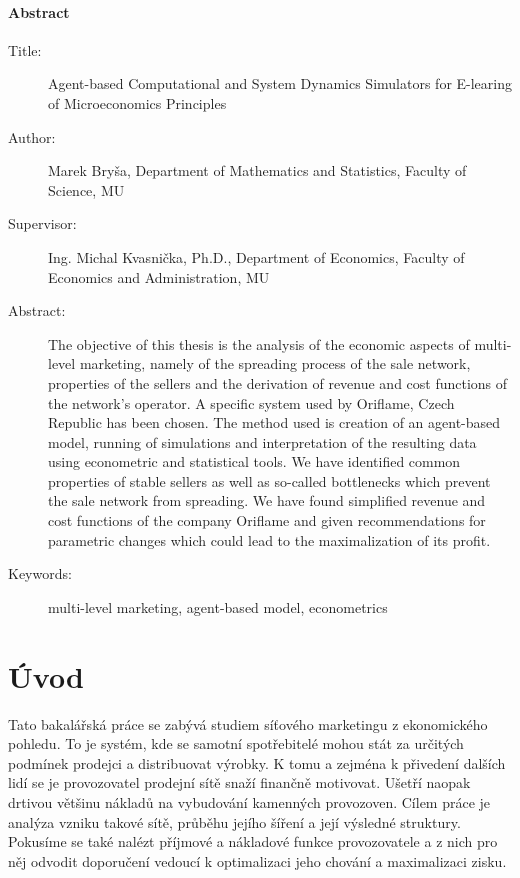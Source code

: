 \documentclass[a4wide,12pt]{report}
\begin{document}
\subsubsection{\large Abstract}
\begin{description}
\item[Title:] Agent-based  Computational and System Dynamics Simulators for E-learing of Microeconomics Principles
\item[Author:] Marek Bryša, Department of Mathematics and Statistics, Faculty of Science, MU
\item[Supervisor:] Ing. Michal Kvasnička, Ph.D., Department of Economics, Faculty of Economics and Administration, MU
\item[Abstract:] The objective of this thesis is the analysis of the economic aspects of multi-level marketing, namely of the spreading process of the sale network, properties of the sellers and the derivation of revenue and cost functions of the network's operator. A specific system used by Oriflame, Czech Republic has been chosen. The method used is creation of an agent-based model, running of simulations and interpretation of the resulting data using econometric and statistical tools. We have identified common properties of stable sellers as well as so-called bottlenecks which prevent the sale network from spreading. We have found simplified revenue and cost functions of the company Oriflame and given recommendations for parametric changes which could lead to the maximalization of its profit.
\item[Keywords:] multi-level marketing, agent-based model, econometrics
\end{description}
\newpage
\tableofcontents

\chapter*{Úvod}
Tato bakalářská práce se zabývá studiem síťového marketingu z ekonomického pohledu. To je systém, kde se samotní spotřebitelé mohou stát za určitých podmínek prodejci a distribuovat výrobky. K tomu a zejména k přivedení dalších lidí se je provozovatel prodejní sítě snaží finančně motivovat. Ušetří naopak drtivou většinu nákladů na vybudování kamenných provozoven. Cílem práce je analýza vzniku takové sítě, průběhu jejího šíření a její výsledné struktury. Pokusíme se také nalézt příjmové a nákladové funkce provozovatele a z nich pro něj odvodit doporučení vedoucí k optimalizaci jeho chování a maximalizaci zisku.
\end{document}
